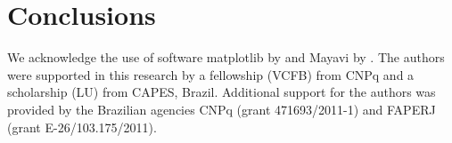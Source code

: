\documentclass[twocolumn,final]{svjour3}
\begin{document}
\section{Conclusions}
\begin{sloppypar}
\end{sloppypar}

\begin{acknowledgements}
We acknowledge the use of software
matplotlib by \citet{matplotlib} and
Mayavi by \citet{mayavi}.
The authors were supported in this research by
a fellowship (VCFB) from CNPq
and a scholarship (LU) from CAPES, Brazil.
Additional support for the authors
was provided by the Brazilian agencies
CNPq (grant 471693/2011-1) and FAPERJ (grant E-26/103.175/2011).
\end{acknowledgements}
\end{document}

